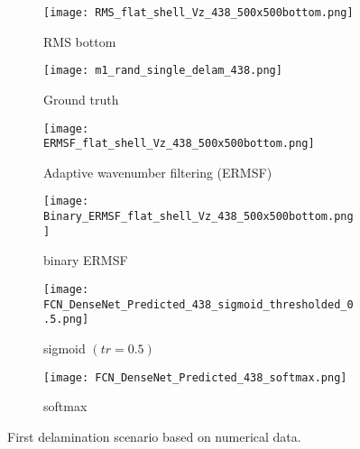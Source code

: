 	\begin{figure} [!h]
		\centering
		\begin{subfigure}[b]{0.47\textwidth}
			\centering
			\texttt{[image: RMS\_flat\_shell\_Vz\_438\_500x500bottom.png]}
			\caption{RMS bottom}
			\label{fig:RMS_flat_shell_Vz_438}
		\end{subfigure}
		\hfill
			\begin{subfigure}[b]{0.47\textwidth}
			\centering
			\texttt{[image: m1\_rand\_single\_delam\_438.png]}
			\caption{Ground truth}
			\label{fig:m1_rand_single_delam_438}
		\end{subfigure}
		\hfill
		\begin{subfigure}[b]{0.47\textwidth}
			\centering
			\texttt{[image: ERMSF\_flat\_shell\_Vz\_438\_500x500bottom.png]}
			\caption{Adaptive wavenumber filtering (ERMSF)}
			\label{fig:ERMSF_flat_shell_Vz_438}
		\end{subfigure}
		\hfill
		\begin{subfigure}[b]{0.47\textwidth}
			\centering
			\texttt{[image: Binary\_ERMSF\_flat\_shell\_Vz\_438\_500x500bottom.png]}
			\caption{binary ERMSF}
			\label{fig:Binary_ERMSF_flat_shell_Vz_438}
		\end{subfigure}
		\hfill
		\begin{subfigure}[b]{0.47\textwidth}
			\centering
		\texttt{[image: FCN\_DenseNet\_Predicted\_438\_sigmoid\_thresholded\_0.5.png]}
		\caption{sigmoid \((tr = 0.5)\)}
		\label{fig:predict_438_sigmoid_tr_0.5}
		\end{subfigure}
		\hfill
		\begin{subfigure}[b]{0.47\textwidth}
			\centering
			\texttt{[image: FCN\_DenseNet\_Predicted\_438\_softmax.png]}
			\caption{softmax}
			\label{fig:predict_438_softmax}
		\end{subfigure}
		\caption{First delamination scenario based on numerical data.}
		\label{fig:RMS438}
	\end{figure} 

